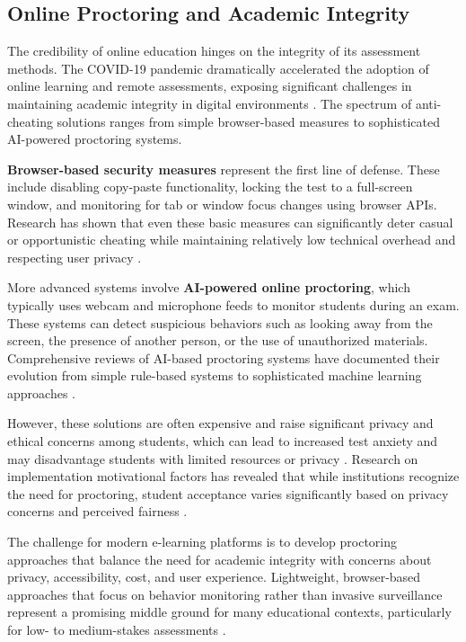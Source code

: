 \subsection{Online Proctoring and Academic Integrity}

The credibility of online education hinges on the integrity of its assessment methods. The COVID-19 pandemic dramatically accelerated the adoption of online learning and remote assessments, exposing significant challenges in maintaining academic integrity in digital environments \citep{hodges2020}. The spectrum of anti-cheating solutions ranges from simple browser-based measures to sophisticated AI-powered proctoring systems.

\textbf{Browser-based security measures} represent the first line of defense. These include disabling copy-paste functionality, locking the test to a full-screen window, and monitoring for tab or window focus changes using browser APIs. Research has shown that even these basic measures can significantly deter casual or opportunistic cheating while maintaining relatively low technical overhead and respecting user privacy \citep{balderas2021}.

More advanced systems involve \textbf{AI-powered online proctoring}, which typically uses webcam and microphone feeds to monitor students during an exam. These systems can detect suspicious behaviors such as looking away from the screen, the presence of another person, or the use of unauthorized materials. Comprehensive reviews of AI-based proctoring systems have documented their evolution from simple rule-based systems to sophisticated machine learning approaches \citep{balderas2021}.

However, these solutions are often expensive and raise significant privacy and ethical concerns among students, which can lead to increased test anxiety and may disadvantage students with limited resources or privacy \citep{balderas2021}. Research on implementation motivational factors has revealed that while institutions recognize the need for proctoring, student acceptance varies significantly based on privacy concerns and perceived fairness \citep{balderas2021}.

The challenge for modern e-learning platforms is to develop proctoring approaches that balance the need for academic integrity with concerns about privacy, accessibility, cost, and user experience. Lightweight, browser-based approaches that focus on behavior monitoring rather than invasive surveillance represent a promising middle ground for many educational contexts, particularly for low- to medium-stakes assessments \citep{balderas2021}.

